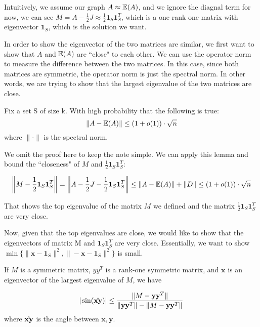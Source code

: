 \documentclass{article}
\begin{document}
Intuitively, we assume our graph $A \approx \operatorname{\mathbb{E}}(A)$, and we ignore the diagnal
term for now, we can see $M = A - \frac{1}{2}J \approx \frac{1}{2} \mathbf{1}_S
\mathbf{1}_S^T$, which is a one rank one matrix with eigenvector
$\mathbf{1}_S$, which is the solution we want. 

In order to show the eigenvector of the two matrices are similar, we first want
to show that $A$ and $\operatorname{\mathbb{E}}(A)$ are ``close" to each other. We can use the operator norm to measure the difference between the two matrices. In this case, since both matrices are symmetric, the operator norm is just the spectral norm. In other words, we are trying to show that the largest eigenvalue of the two matrices are close. 

\begin{lemma}
Fix a set S of size k. With high probability that the following is true:
$$\|A-\operatorname{\mathbb{E}}(A)\| \leq (1+o(1))\cdot \sqrt{n}$$
where $\|\cdot\|$ is the spectral norm.
\end{lemma} 
We omit the proof here to keep the note simple. 
We can apply this lemma and bound the ``closeness" of $M$ and $\frac{1}{2}\mathbf{1}_S\mathbf{1}_S^T$:

$$\left\|M- \frac{1}{2}\mathbf{1}_S\mathbf{1}_S^T\right\| =
\left\|A-\frac{1}{2}J - \frac{1}{2}\mathbf{1}_S\mathbf{1}_S^T\right\| \leq \|A-\operatorname{\mathbb{E}}(A)\|   + \|D\|\leq(1+o(1))\cdot \sqrt{n}$$

That shows the top eigenvalue of the matrix $M$ we defined and the matrix $ \frac{1}{2}\mathbf{1}_S\mathbf{1}_S^T$ are very close.

Now, given that the top eigenvalues are close, we would like to show that the eigenvectors of matrix M and $\mathbf{1}_S\mathbf{1}_S^T$ are very close. Essentially, we want to show
$\min\{\|\mathbf{x}-\mathbf{1}_S\|^2, \|-\mathbf{x}-\mathbf{1}_S\|^2\}$ is small.
\begin{theorem}
If $M$ is a symmetric matrix, $yy^T$ is a rank-one symmetric matrix, and $\mathbf{x}$ is an eigenvector of the largest eigenvalue of $M$, we have

$$|\sin(\Hat{\mathbf{x} \mathbf{y}})| \leq \dfrac{\|M - \mathbf{y}\mathbf{y}^T\|}{\|\mathbf{y}\mathbf{y}^T\| - \|M - \mathbf{y}\mathbf{y}^T\|}$$
where $\Hat{\mathbf{x}\mathbf{y}}$ is the angle between $\mathbf{x}, \mathbf{y}$.
\end{theorem}
\end{document}
